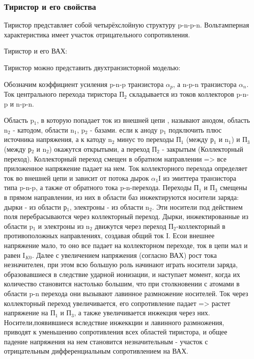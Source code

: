 \subsubsection{Тиристор и его свойства}

Тиристор представляет собой четырёхслойную структуру p-n-p-n. Вольтамперная характеристика имеет участок отрицательного сопротивления. 

Тиристор и его ВАХ:
\begin{center}
	\begin{figure}[h!]
		\caption{}	
	\end{figure}
\end{center}

Тиристор можно представить двухтранзисторной моделью:
\begin{center}
	\begin{figure}[h!]
		\caption{}	
	\end{figure}
\end{center}


Обозначим коэффициент усиления p-n-p транзистора $\alpha_p$, а n-p-n транзистора $\alpha_n$. Ток центрального перехода тиристора П$_2$ складывается из токов коллекторов p-n-p и n-p-n. 

Область p$_1$, в которую попадает ток из внешней цепи , называют анодом, область n$_2$  - катодом, области n$_1$, p$_2$ - базами. если к аноду p$_1$ подключить плюс источника напряжения, а к катоду n$_2$ минус то переходы П$_1$ (между р$_1$ и n$_1$) и  П$_3$ (между р$_2$ и n$_2$) окажутся открытыми, а переход П$_2$ - закрытым (Коллекторный переход). Коллекторный переход смещен в обратном направлении => все приложенное напряжение падает на нем. Ток коллекторного перехода определяет ток во внешней цепи и зависит от потока дырок $\alpha_1$I из эмиттера транзистора типа p-n-p, а также от обратного тока p-n-перехода. Переходы П$_1$ и П$_3$ смещены в прямом направлении, из них в области баз инжектируются носители заряда: дырки - из области р$_1$, электроны - из области n$_2$. Эти носители под действием поля перебрасываются через коллекторный переход. Дырки, инжектированные из области p$_1$ и электроны из n$_2$ движутся через переход П$_2$-коллекторный в противоположных направлениях, создавая общий ток I. Есои внешнее напряжение мало, то оно все падает на коллекторном переходе, ток в цепи мал и равен I$_{K0}$. Далее с увеличением напряжения (согласно ВАХ) рост тока незначителен, при этом всю большую роль начинают играть носители заряда, образовавшиеся в следствие ударной ионизации, и наступает момент, когда их количество становится настолько большим, что при столкновении с атомами в области p-n перехода они вызывают лавинное размножение носителей. Ток через коллекторный переход увеличивается, его сопротивление падает => растет напряжение на П$_1$ и П$_3$, а также увеличивается инжекция через них. Носители,появившиеся вследствие инжеккции и лавинного размножения, приводят к уменьшению сопротивления всех областей тиристора, и общее падение напряжения на нем становится незначительным - участок с отрицательным дифференциальным сопротивлением на ВАХ.

